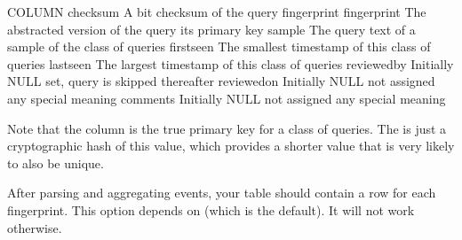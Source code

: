 \documentclass[letterpaper,10pt,english]{sphinxmanual}
\begin{document}
\begin{fulllineitems}
\begin{sphinxVerbatim}[commandchars=\\\{\}]
COLUMN       
  
checksum     A \PYGZhy{}bit checksum of the query fingerprint
fingerprint  The abstracted version of the query its primary key
sample       The query text of a sample of the class of queries
first\PYGZus{}seen   The smallest timestamp of this class of queries
last\PYGZus{}seen    The largest timestamp of this class of queries
reviewed\PYGZus{}by  Initially NULL  set, query is skipped thereafter
reviewed\PYGZus{}on  Initially NULL not assigned any special meaning
comments     Initially NULL not assigned any special meaning
\end{sphinxVerbatim}

\sphinxAtStartPar
Note that the  column is the true primary key for a class of
queries.  The  is just a cryptographic hash of this value, which
provides a shorter value that is very likely to also be unique.

\sphinxAtStartPar
After parsing and aggregating events, your table should contain a row for each
fingerprint.  This option depends on  (which is the
default).  It will not work otherwise.

\end{fulllineitems}

\end{document}

